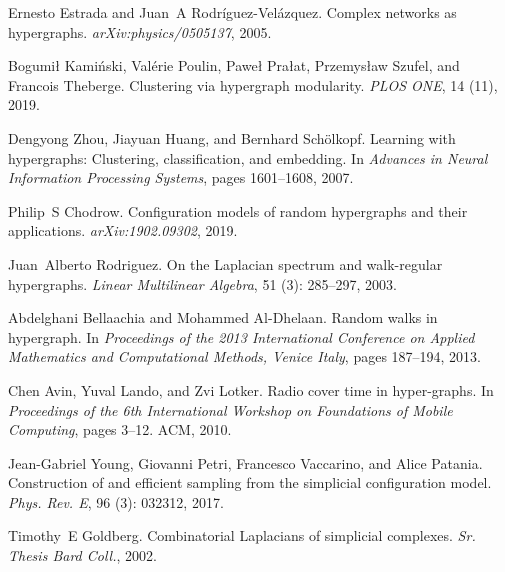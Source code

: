 Ernesto Estrada and Juan~A {Rodr{\'i}guez-Vel{\'a}zquez}.
\newblock Complex networks as hypergraphs.
\newblock \emph{arXiv:physics/0505137}, 2005.

Bogumi{\l} Kami{\'n}ski, Val{\'e}rie Poulin, Pawe{\l} Pra{\l}at, Przemys{\l}aw
Szufel, and Francois Theberge.
\newblock Clustering via hypergraph modularity.
\newblock \emph{PLOS ONE}, 14 (11), 2019.

Dengyong Zhou, Jiayuan Huang, and Bernhard Sch{\"o}lkopf.
\newblock Learning with hypergraphs: {{Clustering}}, classification, and
embedding.
\newblock In \emph{Advances in Neural Information Processing Systems}, pages
1601--1608, 2007{}.

Philip~S Chodrow.
\newblock Configuration models of random hypergraphs and their applications.
\newblock \emph{arXiv:1902.09302}, 2019.

Juan~Alberto Rodriguez.
\newblock On the {{Laplacian}} spectrum and walk-regular hypergraphs.
\newblock \emph{Linear Multilinear Algebra}, 51 (3):
285--297, 2003.

Abdelghani Bellaachia and Mohammed {Al-Dhelaan}.
\newblock Random walks in hypergraph.
\newblock In \emph{Proceedings of the 2013 International Conference on Applied
    Mathematics and Computational Methods, Venice Italy}, pages 187--194, 2013.

Chen Avin, Yuval Lando, and Zvi Lotker.
\newblock Radio cover time in hyper-graphs.
\newblock In \emph{Proceedings of the 6th International Workshop on Foundations
    of Mobile Computing}, pages 3--12. {ACM}, 2010.

Jean-Gabriel Young, Giovanni Petri, Francesco Vaccarino, and Alice Patania.
\newblock Construction of and efficient sampling from the simplicial
configuration model.
\newblock \emph{Phys. Rev. E}, 96 (3): 032312, 2017.

Timothy~E Goldberg.
\newblock Combinatorial {{Laplacians}} of simplicial complexes.
\newblock \emph{Sr. Thesis Bard Coll.}, 2002.

